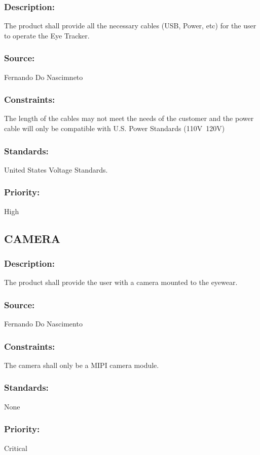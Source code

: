 \subsubsection{Description:}
	{The product shall provide all the necessary cables (USB, Power, etc) for the user to operate the Eye Tracker.}
\subsubsection{Source:} 
	{Fernando Do Nascimneto}
\subsubsection{Constraints:} 
	{The length of the cables may not meet the needs of the customer and the power cable will only be compatible with U.S. Power Standards (110V~120V)}
\subsubsection{Standards:} 
	{United States Voltage Standards.}
\subsubsection{Priority:} 
	{High}
\newline
\newline
	
\subsection{\text CAMERA}
\subsubsection{Description:} 
	{The product shall provide the user with a camera mounted to the eyewear.}
\subsubsection{Source:} 
	{Fernando Do Nascimento}
\subsubsection{Constraints:} 
	{The camera shall only be a MIPI camera module.}
\subsubsection{Standards:} 
	{None}
\subsubsection{Priority:} 
	{Critical}
\newline
\newline
	
